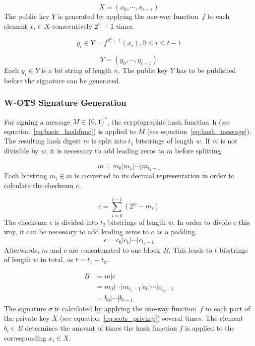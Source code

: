 \begin{equation}
\label{eq:wots_privkey}
X = (x_0, \cdots, x_{t-1})
\end{equation}
The public key $Y$ is generated by applying the one-way function~$f$ to each element $x_i  \in X$  consecutively $2^w - 1$ times. %

\begin{equation}
y_i \in Y =  f^{2^w-1}(x_i), 0 \leq i \leq t-1 
\end{equation}

\begin{equation}
Y = (y_0, \cdots, y_{t-1})
\end{equation}
Each $y_i \in Y$ is a bit string of length $n$. The public key $Y$ has to be published before the signature can be generated.

\subsubsection{W-OTS Signature Generation}
For signing a message $M \in \lbrace 0,1 \rbrace^*$, the cryptographic hash function~h (see equation~\ref{eq:basic_hashfunc}) is applied to $M$ (see equation~\ref{eq:hash_message}). The resulting hash digest $m$ is split into $t_1$ bitstrings of length $w$. If $m$ is not divisible by $w$, it is necessary to add leading zeros to $m$ before splitting.

\begin{equation}
\label{eq:hash_digest_split}
m = m_0 | m_1 | \cdots | m_{t_1-1}
\end{equation}
Each bitstring $m_i \in m$ is converted to its decimal representation in order to calculate the checksum $c$.

\begin{equation}
\label{eq:checksum_calculation}
c = \sum_{i = 0}^{t-1}(2^w-m_i)
\end{equation}
The checksum $c$ is divided into $t_2$ bitstrings of length $w$. In order to divide $c$ this way, it can be necessary to add leading zeros to $c$ as a padding.
\begin{equation}
c = c_0 | c_1 | \cdots | c_{t_2 - 1}
\end{equation}
Afterwards, $m$ and $c$ are concatenated to one block~$B$. This leads to $t$ bitstrings of length $w$ in total, as $t = t_1 + t_2$.

\begin{align}
\label{eq:block_B_out_of_M_and_C}
B &= m | c  \\ 
&= m_0 | \cdots | m_{t_1 - 1} | c_0 | \cdots | c_{t_2 - 1} \nonumber \\
&= b_0 | \cdots | b_{t-1} \nonumber
\end{align}
The signature $\sigma$ is calculated by applying the one-way function~$f$ to each part of the private key $X$ (see equation~\ref{eq:wots_privkey}) several times: The element $b_i \in B$ determines the amount of times the hash function $f$ is applied to the corresponding $x_i \in X$.

